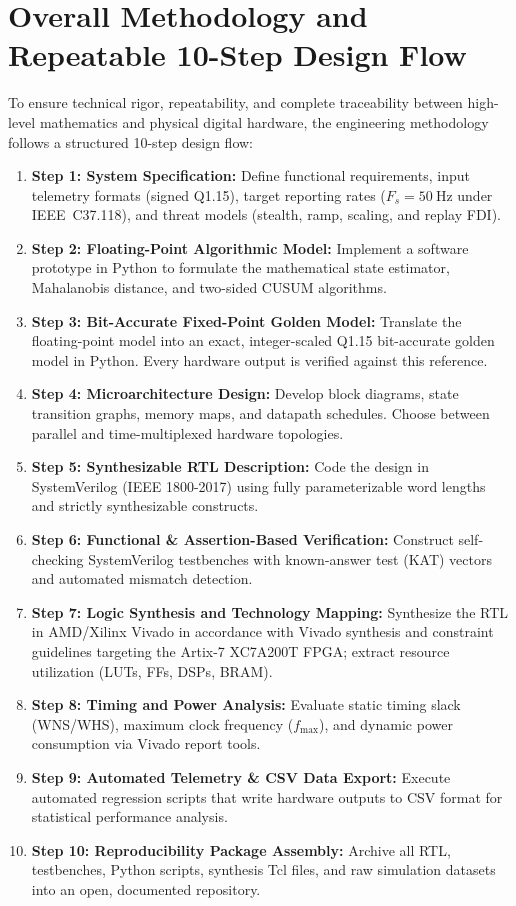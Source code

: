 \documentclass[11pt,a4paper]{report}
\begin{document}
\section{Overall Methodology and Repeatable 10-Step Design Flow}
To ensure technical rigor, repeatability, and complete traceability between high-level
mathematics and physical digital hardware, the engineering methodology follows a structured
10-step design flow:
\begin{enumerate}
    \item \textbf{Step 1: System Specification:} Define functional requirements, input telemetry
    formats (signed Q1.15), target reporting rates ($F_s = 50~\text{Hz}$ under IEEE~C37.118),
    and threat models (stealth, ramp, scaling, and replay FDI).
    \item \textbf{Step 2: Floating-Point Algorithmic Model:} Implement a software prototype in
    Python to formulate the mathematical state estimator, Mahalanobis distance, and two-sided
    CUSUM algorithms.
    \item \textbf{Step 3: Bit-Accurate Fixed-Point Golden Model:} Translate the floating-point
    model into an exact, integer-scaled Q1.15 bit-accurate golden model in Python. Every hardware
    output is verified against this reference.
    \item \textbf{Step 4: Microarchitecture Design:} Develop block diagrams, state transition
    graphs, memory maps, and datapath schedules. Choose between parallel and time-multiplexed
    hardware topologies.
    \item \textbf{Step 5: Synthesizable RTL Description:} Code the design in SystemVerilog
    (IEEE 1800-2017) using fully parameterizable word lengths and strictly synthesizable constructs.
    \item \textbf{Step 6: Functional \& Assertion-Based Verification:} Construct self-checking
    SystemVerilog testbenches with known-answer test (KAT) vectors and automated mismatch detection.
    \item \textbf{Step 7: Logic Synthesis and Technology Mapping:} Synthesize the RTL in AMD/Xilinx
    Vivado in accordance with Vivado synthesis and constraint guidelines \cite{ug901,ug903,ug907} targeting the Artix-7 XC7A200T FPGA; extract resource utilization (LUTs, FFs, DSPs, BRAM).
    \item \textbf{Step 8: Timing and Power Analysis:} Evaluate static timing slack (WNS/WHS),
    maximum clock frequency ($f_{\max}$), and dynamic power consumption via Vivado report tools.
    \item \textbf{Step 9: Automated Telemetry \& CSV Data Export:} Execute automated regression
    scripts that write hardware outputs to CSV format for statistical performance analysis.
    \item \textbf{Step 10: Reproducibility Package Assembly:} Archive all RTL, testbenches, Python
    scripts, synthesis Tcl files, and raw simulation datasets into an open, documented repository.
\end{enumerate}
\end{document}
